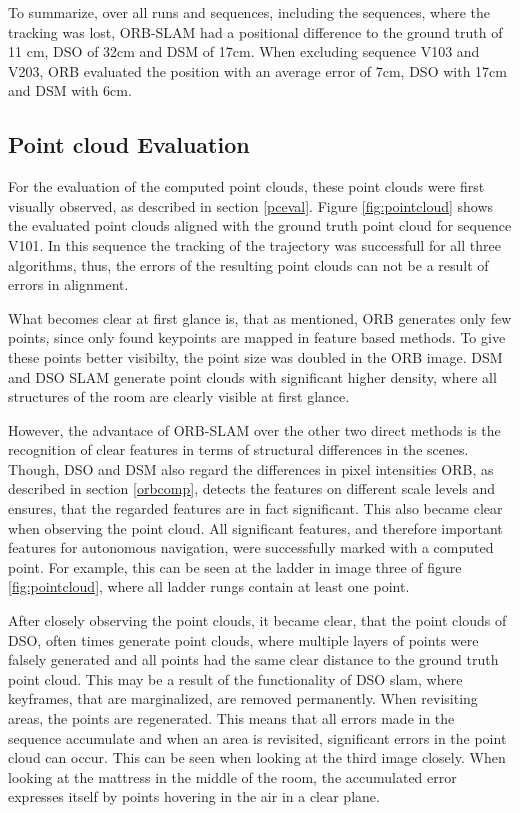 	To summarize, over all runs and sequences, including the sequences, where the tracking was lost, ORB-SLAM had a positional difference to the ground truth 
	of 11 cm, DSO of 32cm and DSM of 17cm. When excluding sequence V103 and V203, ORB evaluated the position with an average error of 7cm, DSO with 17cm and DSM with 6cm. 
	
\subsection{Point cloud Evaluation}

For the evaluation of the computed point clouds, these point clouds were first visually observed, as described in section \ref{pceval}. 
Figure \ref{fig:pointcloud} shows the evaluated point clouds aligned with the ground truth point cloud for sequence V101. In this sequence
 the tracking of the trajectory was successfull for all three algorithms, thus, the errors of the resulting point clouds can not 
be a result of errors in alignment. 

What becomes clear at first glance is, that as mentioned, ORB generates only few points, since only found keypoints are mapped in feature based methods.
 To give these  points better visibilty, the point size was doubled in the ORB image. DSM and DSO SLAM generate point clouds with significant higher 
 density, where all structures of the room are clearly visible at first glance. 
 
 However, the advantace of ORB-SLAM over the other two direct methods 
 is the recognition of clear features in terms of structural differences in the scenes. Though, DSO and DSM also regard the differences in pixel intensities
 ORB, as described in section \ref{orbcomp}, detects the features on different scale levels and ensures, that the regarded features are in fact significant. 
 This also became clear when observing the point cloud. All significant features, and therefore important features for autonomous navigation, were successfully 
 marked with a computed point. For example, this can be seen at the ladder in image three of figure \ref{fig:pointcloud}, where all ladder rungs contain at least 
 one point. 
 
 After closely observing the point clouds, it became clear, that the point clouds of DSO, often times generate point clouds, where multiple layers of 
 points were falsely generated and all points had the same clear distance to the ground truth point cloud. This may be a result of the functionality of DSO slam, 
 where keyframes, that are marginalized, are removed permanently. When revisiting areas, the points are regenerated. This means that all errors made
 in the sequence accumulate and when an area is revisited, significant errors in the point cloud can occur. This can be seen when looking at the 
 third image closely. When looking at the mattress in the middle of the room, the accumulated error expresses itself by points hovering in the air 
 in a clear plane. 

